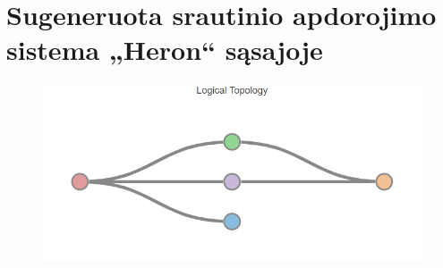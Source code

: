 \documentclass{VUMIFPSbakalaurinis}
\begin{document}
\section{Sugeneruota srautinio apdorojimo sistema „Heron“ sąsajoje}\label{add:generated-system1}
\begin{figure}[H]
    \centering
    \includegraphics[width=1\textwidth]{img/generated-topology-1.png}
    \label{img:generated-data}
\end{figure}
\end{document}

